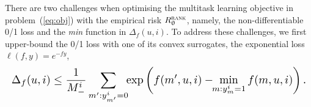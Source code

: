 %


There are two challenges %
when optimising the multitask learning objective in problem~(\ref{eq:obj}) 
with the empirical risk $R_{\uptheta}^{\textsc{rank}}$,
namely, the non-differentiable 0/1 loss and the \emph{min} function in %
$\Delta_f(u, i)$.
To address these challenges, we first upper-bound %
the 0/1 loss with one of its convex surrogates, %
\eg the exponential loss $\ell(f, y) = e^{-fy}$,
\begin{equation*}
\resizebox{\columnwidth}{!}{$
\displaystyle 
\Delta_f(u, i) \le 
\frac{1}{M_-^i} \sum_{m': y_{m'}^i = 0} \!\! \exp \left(f(m', u, i) - \!\! \min_{m: y_m^i = 1} f(m, u, i) \right).
$}
\end{equation*}


